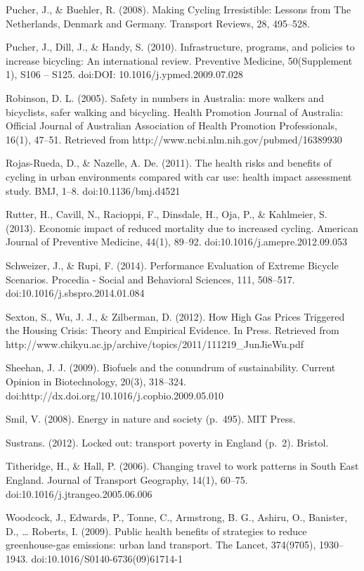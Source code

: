 Pucher, J., \& Buehler, R. (2008). Making Cycling Irresistible: Lessons
from The Netherlands, Denmark and Germany. Transport Reviews, 28,
495--528.

Pucher, J., Dill, J., \& Handy, S. (2010). Infrastructure, programs, and
policies to increase bicycling: An international review. Preventive
Medicine, 50(Supplement 1), S106 -- S125. doi:DOI:
10.1016/j.ypmed.2009.07.028

Robinson, D. L. (2005). Safety in numbers in Australia: more walkers and
bicyclists, safer walking and bicycling. Health Promotion Journal of
Australia: Official Journal of Australian Association of Health
Promotion Professionals, 16(1), 47--51. Retrieved from
http://www.ncbi.nlm.nih.gov/pubmed/16389930

Rojas-Rueda, D., \& Nazelle, A. De. (2011). The health risks and
benefits of cycling in urban environments compared with car use: health
impact assessment study. BMJ, 1--8. doi:10.1136/bmj.d4521

Rutter, H., Cavill, N., Racioppi, F., Dinsdale, H., Oja, P., \&
Kahlmeier, S. (2013). Economic impact of reduced mortality due to
increased cycling. American Journal of Preventive Medicine, 44(1),
89--92. doi:10.1016/j.amepre.2012.09.053

Schweizer, J., \& Rupi, F. (2014). Performance Evaluation of Extreme
Bicycle Scenarios. Procedia - Social and Behavioral Sciences, 111,
508--517. doi:10.1016/j.sbspro.2014.01.084

Sexton, S., Wu, J. J., \& Zilberman, D. (2012). How High Gas Prices
Triggered the Housing Crisis: Theory and Empirical Evidence. In Press.
Retrieved from
http://www.chikyu.ac.jp/archive/topics/2011/111219\_JunJieWu.pdf

Sheehan, J. J. (2009). Biofuels and the conundrum of sustainability.
Current Opinion in Biotechnology, 20(3), 318--324.
doi:http://dx.doi.org/10.1016/j.copbio.2009.05.010

Smil, V. (2008). Energy in nature and society (p.~495). MIT Press.

Sustrans. (2012). Locked out: transport poverty in England (p.~2).
Bristol.

Titheridge, H., \& Hall, P. (2006). Changing travel to work patterns in
South East England. Journal of Transport Geography, 14(1), 60--75.
doi:10.1016/j.jtrangeo.2005.06.006

Woodcock, J., Edwards, P., Tonne, C., Armstrong, B. G., Ashiru, O.,
Banister, D., \ldots{} Roberts, I. (2009). Public health benefits of
strategies to reduce greenhouse-gas emissions: urban land transport. The
Lancet, 374(9705), 1930--1943. doi:10.1016/S0140-6736(09)61714-1
